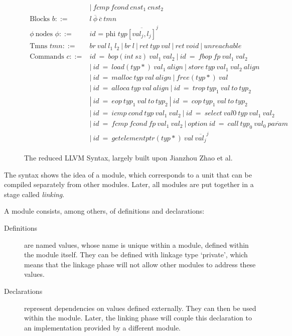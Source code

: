 \begin{figure}[!htb]
\begin{align*}
\begin{aligned}
&\mathit{|\ fcmp\ fcond\ cnst_{1}\ cnst_{2}}\\
%
%
\text{Blocks } \mathit{b} ::= &\mathit{l\ \overline{\phi}\ \overline{c}\ tmn} \\
\phi\ \text{nodes } \phi ::= &\mathit{id} \text{ = phi } \mathit{typ \overline{[val_{j} , l_{j} ]}^{j}}\\
\text{Tmns } \mathit{tmn} ::= &\mathit{br\ val\ l_{1}\ l_{2} \ |\ br\ l \ |\ ret\ typ\ val\ |\ ret\ void\ |\ unreachable} \\
\text{Commands } \mathit{c} ::= &\mathit{id\ =\ bop(int\ sz)\ val_{1}\ val_{2}\ |\ id\ =\ fbop\ fp\ val_{1}\ val_{2}}\\
&\mathit{|\ id\ =\ load(typ*)\ val_{1}\ align\ |\ store\ typ\ val_{1}\ val_{2}\ align}\\
&\mathit{|\ id\ =\ malloc\ typ\ val\ align\ |\ free(typ * )\ val}\\
&\mathit{|\ id\ =\ alloca\ typ\ val\ align\ |\ id\ =\ trop\ typ_{1}\ val\ to\ typ_{2}}\\
&\mathit{|\ id\ =\ eop\ typ_{1}\ val\ to\ typ_{2}\ |\ id\ =\ cop\ typ_{1}\ val\ to\ typ_{2}}\\
&\mathit{|\ id\ =\ icmp\ cond\ typ\ val_{1}\ val_{2}\ |\ id\ =\ select\ val0\ typ\ val_{1}\ val_{2}\ }\\
&\mathit{|\ id\ =\ fcmp\ fcond\ fp\ val_{1}\ val_{2}\ |\ option\ id\ =\ call\ typ_{0}\ val_{0}\ \overline{param}}\\
&\mathit{|\ id\ =\ getelementptr(typ*)\ val\ \overline{val_{j}}^{j}}
\end{aligned}
\end{align*}
\caption{The reduced LLVM Syntax, largely built upon Jianzhou Zhao et al. \cite{Zhao:2012:FLI:2103656.2103709} \label{fig:LLVMSyntax}}
\end{figure}

The syntax shows the idea of a module, which corresponds to a unit that can be compiled separately from other modules.
Later, all modules are put together in a stage called \emph{linking}.

A module consists, among others, of definitions and declarations:
\begin{description}
\item[Definitions] are named values, whose name is unique within a module, defined within the module itself.
They can be defined with linkage type `private', which means that the linkage phase will not allow other modules to address these values.
\item[Declarations] represent dependencies on values defined externally.
They can then be used within the module.
Later, the linking phase will couple this declaration to an implementation provided by a different module.
\end{description}
\clearpage
